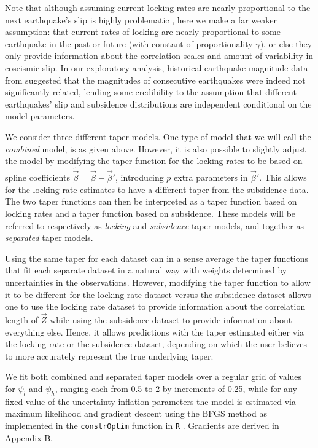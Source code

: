 {Note that although assuming current locking rates are nearly proportional to the next earthquake's slip is highly problematic \citep{wang2012}, here we make a far weaker assumption: that current rates of locking are nearly proportional to some earthquake in the past or future (with constant of proportionality $\gamma$), or else they only provide information about the correlation scales and amount of variability in coseismic slip.  In our exploratory analysis, historical earthquake magnitude data from \citet{goldfinger2012} suggested that the magnitudes of consecutive earthquakes were indeed not significantly related, lending some credibility to the assumption that different earthquakes' slip and subsidence distributions are independent conditional on the model parameters.

We consider three different taper models.  One type of model that we will call the \textit{combined} model, is as given above.  However, it is also possible to slightly adjust the model by modifying the taper function for the locking rates to be based on spline coefficients $\tilde{\vec{\beta}} = \vec{\beta} - \vec{\beta}'$, introducing $p$ extra parameters in $\vec{\beta}'$.  This allows for the locking rate estimates to have a different taper from the subsidence data.  The two taper functions can then be interpreted as a taper function based on locking rates and a taper function based on subsidence.   These models will be referred to respectively as \textit{locking} and \textit{subsidence} taper models, and together as \textit{separated} taper models.

Using the same taper for each dataset can in a sense average the taper functions that fit each separate dataset in a natural way with weights determined by uncertainties in the observations.  However, modifying the taper function to allow it to be different for the locking rate dataset versus the subsidence dataset allows one to use the locking rate dataset to provide information about the correlation length of $\vec{Z}$ while using the subsidence dataset to provide information about everything else.  Hence, it allows predictions with the taper estimated either via the locking rate or the subsidence dataset, depending on which the user believes to more accurately represent the true underlying taper.

We fit both combined and separated taper models over a regular grid of values for $\psi_l$ and $\psi_h$, ranging each from 0.5 to 2 by increments of 0.25, while for any fixed value of the uncertainty inflation parameters the model is estimated via maximum likelihood and gradient descent using the BFGS method as implemented in the \verb|constrOptim| function in \verb|R| \citep{BFGS}.  Gradients are derived in Appendix B.

}
